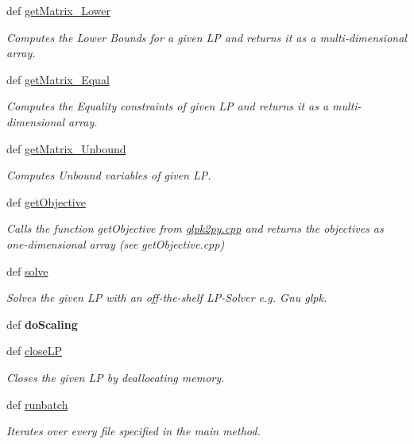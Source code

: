 \begin{DoxyCompactItemize}
def \hyperlink{namespacesymLPExperiments_a92bdbf0ba2cc9cde5c83ecc88f48bdc9}{get\-Matrix\-\_\-\-Lower}
\begin{DoxyCompactList}\small\item\em Computes the Lower Bounds for a given L\-P and returns it as a multi-\/dimensional array. \end{DoxyCompactList}\item 
def \hyperlink{namespacesymLPExperiments_aeff528f7778911571744f131ba25fa5b}{get\-Matrix\-\_\-\-Equal}
\begin{DoxyCompactList}\small\item\em Computes the Equality constraints of given L\-P and returns it as a multi-\/dimensional array. \end{DoxyCompactList}\item 
def \hyperlink{namespacesymLPExperiments_a4be7dae61f3f79886fa2d2f015fef1b5}{get\-Matrix\-\_\-\-Unbound}
\begin{DoxyCompactList}\small\item\em Computes Unbound variables of given L\-P. \end{DoxyCompactList}\item 
def \hyperlink{namespacesymLPExperiments_a8d2d07c1a8b150727dec946b71f19854}{get\-Objective}
\begin{DoxyCompactList}\small\item\em Calls the function get\-Objective from \hyperlink{glpk2py_8cpp}{glpk2py.\-cpp} and returns the objectives as one-\/dimensional array (see get\-Objective.\-cpp) \end{DoxyCompactList}\item 
def \hyperlink{namespacesymLPExperiments_a9149118eedae9835161d4188f43de77a}{solve}
\begin{DoxyCompactList}\small\item\em Solves the given L\-P with an off-\/the-\/shelf L\-P-\/\-Solver e.\-g. Gnu glpk. \end{DoxyCompactList}\item 
\hypertarget{namespacesymLPExperiments_ad16c25f2fef221aa9e16be530727cf07}{def {\bfseries do\-Scaling}}\label{namespacesymLPExperiments_ad16c25f2fef221aa9e16be530727cf07}

\item 
def \hyperlink{namespacesymLPExperiments_af0c1f995f0246facbabd21b2bd88b7de}{close\-L\-P}
\begin{DoxyCompactList}\small\item\em Closes the given L\-P by deallocating memory. \end{DoxyCompactList}\item 
def \hyperlink{namespacesymLPExperiments_a0b36c729a222467b8abb13726eeee5f5}{runbatch}
\begin{DoxyCompactList}\small\item\em Iterates over every file specified in the main method. \end{DoxyCompactList}\end{DoxyCompactItemize}
